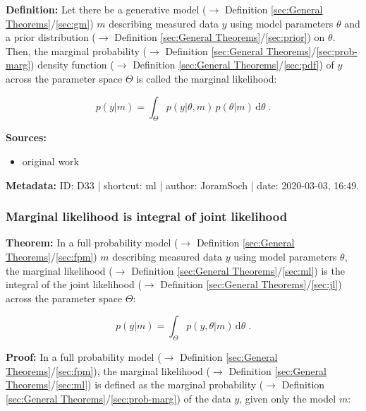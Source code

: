 \documentclass[a4paper,12pt,twoside]{book}
\begin{document}
\textbf{Definition:} Let there be a generative model ($\rightarrow$ Definition \ref{sec:General Theorems}/\ref{sec:gm}) $m$ describing measured data $y$ using model parameters $\theta$ and a prior distribution ($\rightarrow$ Definition \ref{sec:General Theorems}/\ref{sec:prior}) on $\theta$. Then, the marginal probability ($\rightarrow$ Definition \ref{sec:General Theorems}/\ref{sec:prob-marg}) density function ($\rightarrow$ Definition \ref{sec:General Theorems}/\ref{sec:pdf}) of $y$ across the parameter space $\Theta$ is called the marginal likelihood:

\begin{equation} \label{eq:ml-ml}
p(y|m) = \int_{\Theta} p(y|\theta,m) \, p(\theta|m) \, \mathrm{d}\theta \; .
\end{equation}


\vspace{1em}
\textbf{Sources:}
\begin{itemize}
\item original work\end{itemize}


\vspace{1em}
\textbf{Metadata:} ID: D33 | shortcut: ml | author: JoramSoch | date: 2020-03-03, 16:49.
\vspace{1em}



\subsubsection[\textbf{Marginal likelihood is integral of joint likelihood}]{Marginal likelihood is integral of joint likelihood} \label{sec:ml-jl}
\setcounter{equation}{0}

\textbf{Theorem:} In a full probability model ($\rightarrow$ Definition \ref{sec:General Theorems}/\ref{sec:fpm}) $m$ describing measured data $y$ using model parameters $\theta$, the marginal likelihood ($\rightarrow$ Definition \ref{sec:General Theorems}/\ref{sec:ml}) is the integral of the joint likelihood ($\rightarrow$ Definition \ref{sec:General Theorems}/\ref{sec:jl}) across the parameter space $\Theta$:

\begin{equation} \label{eq:ml-jl-ml}
p(y|m) = \int_{\Theta} p(y,\theta|m) \, \mathrm{d}\theta \; .
\end{equation}


\vspace{1em}
\textbf{Proof:} In a full probability model ($\rightarrow$ Definition \ref{sec:General Theorems}/\ref{sec:fpm}), the marginal likelihood ($\rightarrow$ Definition \ref{sec:General Theorems}/\ref{sec:ml}) is defined as the marginal probability ($\rightarrow$ Definition \ref{sec:General Theorems}/\ref{sec:prob-marg}) of the data $y$, given only the model $m$:
\end{document}
